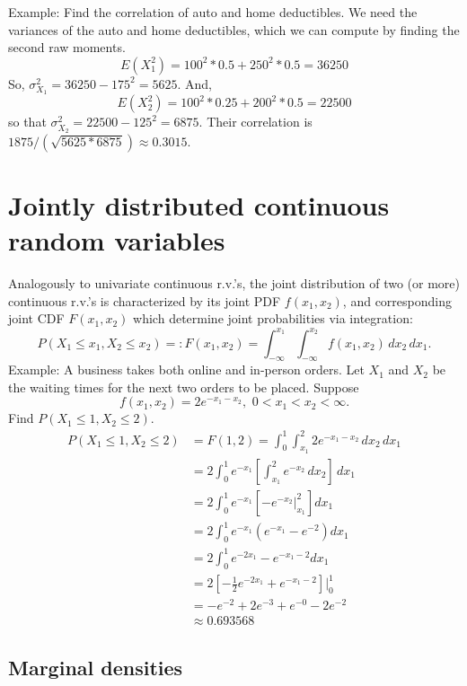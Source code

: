 \documentclass[
]{book}
\begin{document}
Example: Find the correlation of auto and home deductibles.
We need the variances of the auto and home deductibles, which we can compute by finding the second raw moments.
\[E(X_1^2) = 100^2*0.5 + 250^2 * 0.5 = 36250\]
So, \(\sigma_{X_1}^2 = 36250-175^2 = 5625\). And,
\[E(X_2^2) = 100^2*0.25 + 200^2 * 0.5 = 22500\]
so that \(\sigma_{X_2}^2 = 22500 - 125^2 = 6875\).
Their correlation is \(1875/(\sqrt{5625*6875}) \approx 0.3015\).

\hypertarget{jointly-distributed-continuous-random-variables}{%
\section{Jointly distributed continuous random variables}\label{jointly-distributed-continuous-random-variables}}

Analogously to univariate continuous r.v.'s, the joint distribution of two (or more) continuous r.v.'s is characterized by its joint PDF \(f(x_1, x_2)\), and corresponding joint CDF \(F(x_1, x_2)\) which determine joint probabilities via integration:
\[P(X_1\leq x_1, X_2\leq x_2) =: F(x_1,x_2) = \int_{-\infty}^{x_1}\int_{-\infty}^{x_2}f(x_1,x_2)\,dx_2\,dx_1.\]
Example: A business takes both online and in-person orders. Let \(X_1\) and \(X_2\) be the waiting times for the next two orders to be placed. Suppose
\[f(x_1,x_2) = 2e^{-x_1-x_2}, \,\,0<x_1<x_2<\infty.\]
Find \(P(X_1\leq 1, X_2\leq 2)\).\\
\begin{align*}
P(X_1\leq 1, X_2\leq 2) &= F(1,2) = \int_0^1\int_{x_1}^2 2e^{-x_1-x_2} \,dx_2\, dx_1\\
& = 2\int_0^1 e^{-x_1}\left[\int_{x_1}^2 e^{-x_2} \,dx_2\right]\, dx_1\\
& = 2\int_0^1 e^{-x_1} \left[ - e^{-x_2}|_{x_1}^2\right]dx_1\\
& = 2\int_0^1 e^{-x_1}(e^{-x_1} - e^{-2})dx_1\\
& = 2\int_0^1 e^{-2x_1} - e^{-x_1-2}dx_1\\
& = 2[-\tfrac12 e^{-2x_1} + e^{-x_1-2}]|_{0}^1\\
& = -e^{-2}+2e^{-3}+e^{-0}-2e^{-2}\\
& \approx 0.693568
\end{align*}

\hypertarget{marginal-densities}{%
\subsection{Marginal densities}\label{marginal-densities}}
\end{document}
